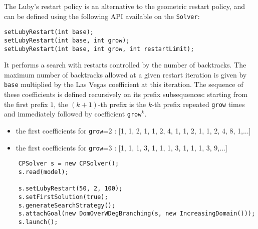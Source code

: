 The Luby's restart policy is an alternative to the geometric restart policy, and can be defined 
using the following API available on the \texttt{Solver}:
\begin{lstlisting}
setLubyRestart(int base);
setLubyRestart(int base, int grow);
setLubyRestart(int base, int grow, int restartLimit);
\end{lstlisting}
It performs a search with restarts controlled by the number of backtracks. 
The maximum number of backtracks allowed at a given restart iteration is given by \texttt{base} multiplied by the Las Vegas coefficient at this iteration. 
The sequence of these coefficients is defined recursively on its prefix subsequences: starting from the first prefix $1$, the $(k+1)$-th prefix is the $k$-th prefix repeated \texttt{grow} times and immediately followed by coefficient \texttt{grow}$^k$.
\begin{itemize}
	\item the first coefficients for \texttt{grow}=2 : [1, 1, 2, 1, 1, 2, 4, 1, 1, 2, 1, 1, 2, 4, 8, 1,...]
	\item the first coefficients for \texttt{grow}=3 : [1, 1, 1, 3, 1, 1, 1, 3, 1, 1, 1, 3, 9,...]
\end{itemize}

\begin{lstlisting}
	CPSolver s = new CPSolver();
	s.read(model);
	
	s.setLubyRestart(50, 2, 100);
	s.setFirstSolution(true);
	s.generateSearchStrategy();
	s.attachGoal(new DomOverWDegBranching(s, new IncreasingDomain()));
	s.launch();
\end{lstlisting}

